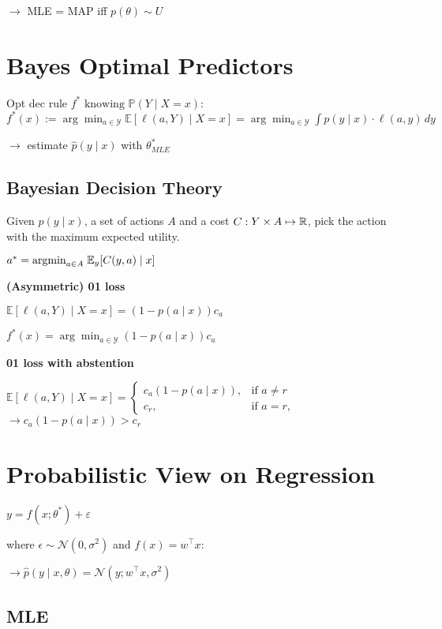$\rightarrow$ MLE = MAP iff $p(\theta) \sim U$



\section*{Bayes Optimal Predictors}

Opt dec rule $f^* \text{ knowing } \mathbb{P}(Y \mid X=x)$:
$f^*(x) := \arg \min_{a \in \mathcal{Y}} \mathbb{E} [\ell(a, Y) \mid X = x] = \arg \min_{a \in \mathcal{Y}} \int p(y \mid x) \cdot \ell(a, y) \, dy$

$\rightarrow$ estimate $\hat{p}(y \mid x)$ with $\theta^*_{MLE}$

\subsection*{Bayesian Decision Theory}

Given $p(y \; | \; x)$, a set of actions $A$ and a cost $C: Y \times A \mapsto \mathbb{R}$, pick the action with the maximum expected utility. 

\qquad \qquad $a^* = \text{argmin}_{a \in A} \; \mathbb{E}_y[C(y,a) \; | \; x]$

\textbf{(Asymmetric) 01 loss}

$\mathbb{E} [\ell(a, Y) \mid X = x] =  \left( 1 - p(a \mid x) \right) c_a$

$f^*(x) = \arg \min_{a \in \mathcal{Y}} \left( 1 - p(a \mid x) \right) c_a
$

\textbf{01 loss with abstention}

$\mathbb{E} [\ell(a, Y) \mid X = x] =
\begin{cases}
c_a(1 - p(a \mid x)), & \text{if } a \neq r \\
c_r, & \text{if } a = r,
\end{cases}$
$\rightarrow c_a(1 - p(a \mid x)) > c_r$ 


\section*{Probabilistic View on Regression}

$y = f(x; \theta^*) + \varepsilon$ 

where $\epsilon \sim \mathcal{N}(0, \sigma^2)$ and $f(x) = w^\top x$:

$ \rightarrow \hat p(y \; | \; x, \theta) = \mathcal{N}(y; w^\top x, \sigma^2)$


\subsection*{MLE} 

